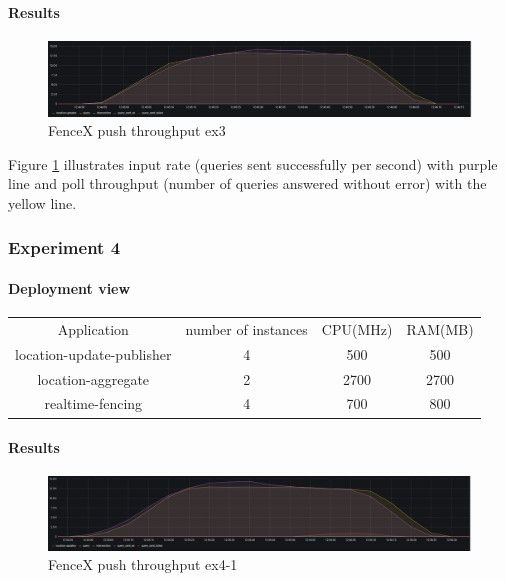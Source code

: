 \documentclass[a4]{report}
\begin{document}
    \paragraph{Results}
    \begin{figure}[ht]
        \caption{FenceX push throughput ex3}
        \label{fig:ex3}
        \includegraphics[scale=0.4]{images/evaluation/ex3-benchmarking(16,9).png}
    \end{figure}

    Figure \ref{fig:ex3} illustrates input rate (queries sent successfully per second) with purple line and poll
    throughput (number of queries answered without error) with the yellow line.

    \subsubsection{Experiment 4}
    \paragraph{Deployment view}
    \begin{center}
        \begin{tabular}{ c c c c }
            Application               &  number of instances     & CPU(MHz)  & RAM(MB)    \\
            location-update-publisher &          4               & 500       &   500      \\
            location-aggregate        &          2               & 2700      &   2700     \\
            realtime-fencing          &          4               & 700       &   800      \\
        \end{tabular}
    \end{center}

    \paragraph{Results}
    \begin{figure}[ht]
        \caption{FenceX push throughput ex4-1}
        \label{fig:ex4-1}
        \includegraphics[scale=0.4]{images/evaluation/ex4-benchmarking(19,10).png}
    \end{figure}
\end{document}
